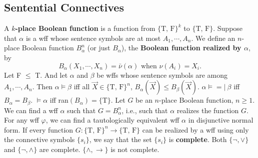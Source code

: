\documentclass{myproc}
\begin{document}
\subsection{Sentential Connectives}
\bit
\w A {\bf{}$k$-place Boolean function} is a function from
	$\{\mbox{T, F}\}^k$ to $\{\mbox{T, F}\}$.
\w Suppose that $\alpha$ is a wff whose sentence symbols are at most
	$A_1, \cdots, A_n$. We define an $n$-place Boolean function
	$B^n_\alpha$ (or just $B_\alpha$), the {\bf{}Boolean function realized
	by $\alpha$}, by 
	\[ B_\alpha(X_1, \cdots, X_n) = \bar\nu(\alpha) 
		\mbox{\ when $\nu(A_i) = X_i$}. \]
\w Let F $\le$ T. And let 
	$\alpha$ and $\beta$ be wffs whose sentence symbols are among
	$A_1, \cdots, A_n$. Then
	\ben
	\w [(a)] $\alpha \models \beta$ iff all $\vec{X} \in 
			\{\mbox{T, F}\}^n$,
			$B_\alpha(\vec{X}) \le B_\beta(\vec{X})$.
	\w [(b)] $\alpha \models =\!\!\!|\ \beta$ iff $B_\alpha = B_\beta$.
	\w [(c)] $\models \alpha$ iff ran$(B_\alpha) = \{\mbox{T}\}$.
	\een
\w Let $G$ be an $n$-place Boolean function, $n \ge 1$. We can
	find a wff $\alpha$ such that $G = B^n_\alpha$, i.e.,
	such that $\alpha$ realizes the function $G$.
\w For any wff $\varphi$, we can find a tautologically equivalent
	wff $\alpha$ in disjunctive normal form.
\w If every function $G: \{\mbox{T, F}\}^n \rightarrow \{\mbox{T, F}\}$
	can be realized by a wff using only the connective symbols 
	$\{s_i\}$, we say that the set $\{s_i\}$ is {\bf{}complete}.
	\bit
	\w Both $\{\neg, \vee\}$ and $\{\neg, \wedge\}$ are complete.
	\w $\{\wedge, \rightarrow\}$ is not complete.
	\eit
\eit
\end{document}
